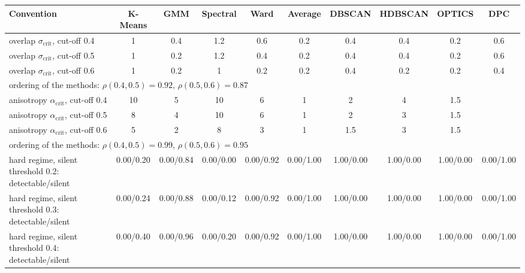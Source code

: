 \begin{tabular}{@{}lccccccccc@{}}
\toprule
Convention & K-Means & GMM & Spectral & Ward & Average & DBSCAN & HDBSCAN & OPTICS & DPC \\
\midrule
overlap $\sigma_{\text{crit}}$, cut-off 0.4 & 1 & 0.4 & 1.2 & 0.6 & 0.2 & 0.4 & 0.4 & 0.2 & 0.6 \\
overlap $\sigma_{\text{crit}}$, cut-off 0.5 & 1 & 0.2 & 1.2 & 0.4 & 0.2 & 0.4 & 0.4 & 0.2 & 0.6 \\
overlap $\sigma_{\text{crit}}$, cut-off 0.6 & 1 & 0.2 & 1 & 0.2 & 0.2 & 0.4 & 0.2 & 0.2 & 0.4 \\
\multicolumn{10}{l}{\quad ordering of the methods: $\rho(0.4, 0.5) = 0.92$, $\rho(0.5, 0.6) = 0.87$} \\
anisotropy $\alpha_{\text{crit}}$, cut-off 0.4 & 10 & 5 & 10 & 6 & 1 & 2 & 4 & 1.5 \\
anisotropy $\alpha_{\text{crit}}$, cut-off 0.5 & 8 & 4 & 10 & 6 & 1 & 2 & 3 & 1.5 \\
anisotropy $\alpha_{\text{crit}}$, cut-off 0.6 & 5 & 2 & 8 & 3 & 1 & 1.5 & 3 & 1.5 \\
\multicolumn{9}{l}{\quad ordering of the methods: $\rho(0.4, 0.5) = 0.99$, $\rho(0.5, 0.6) = 0.95$} \\
hard regime, silent threshold 0.2: detectable/silent & 0.00/0.20 & 0.00/0.84 & 0.00/0.00 & 0.00/0.92 & 0.00/1.00 & 1.00/0.00 & 1.00/0.00 & 1.00/0.00 & 0.00/1.00 \\
hard regime, silent threshold 0.3: detectable/silent & 0.00/0.24 & 0.00/0.88 & 0.00/0.12 & 0.00/0.92 & 0.00/1.00 & 1.00/0.00 & 1.00/0.00 & 1.00/0.00 & 0.00/1.00 \\
hard regime, silent threshold 0.4: detectable/silent & 0.00/0.40 & 0.00/0.96 & 0.00/0.20 & 0.00/0.92 & 0.00/1.00 & 1.00/0.00 & 1.00/0.00 & 1.00/0.00 & 0.00/1.00 \\
\bottomrule
\end{tabular}
